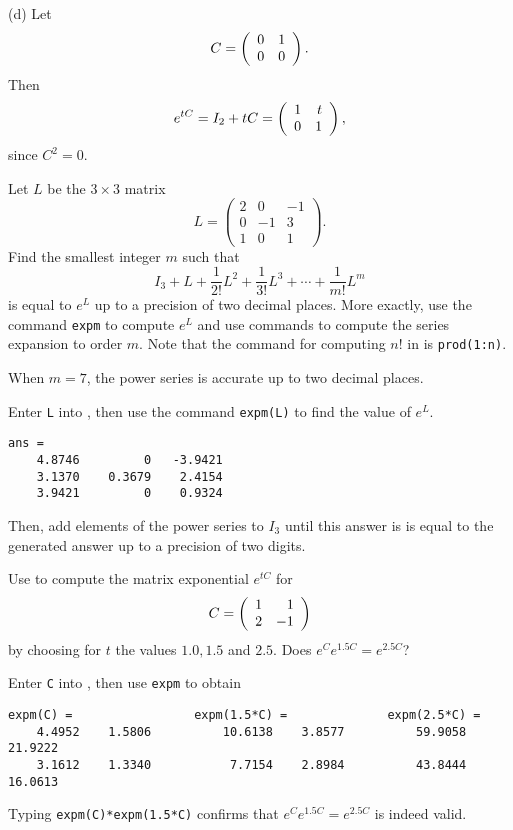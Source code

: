 \documentclass{ximera}
\begin{document}
\noindent (d) \quad Let
\[
C = \left(\begin{array}{rr} 0 & 1\\ 0 &0\end{array}\right).
\]
Then
\begin{equation}  \label{e:nilpotent}
e^{tC} = I_2 + tC = \left(\begin{array}{rr} 1 & t\\ 0 &1\end{array}\right),
\end{equation}
since $C^2=0$.

\EXER

\CEXER

\begin{exercise} \label{c6.2.1}
Let $L$ be the $3\times 3$ matrix
\[
     L = \left(\begin{array}{rrr}
    2 & 0 & -1\\
    0 & -1 & 3\\
    1 & 0 & 1
               \end{array}\right).
\]
Find the smallest integer $m$ such that
\[
  I_3+L+\frac{1}{2!} L^2 + \frac{1}{3!} L^3 + \cdots
  + \frac{1}{m!} L^m
\]
is equal to $e^L$ up to a precision of two decimal places.  More
exactly, use the \Matlab command {\tt expm} to compute $e^L$ and
use \Matlab commands to compute the series expansion to order $m$.  Note
that the command for computing $n!$ in \Matlab is
{\tt prod(1:n)}.

\begin{solution}

\ans When $m = 7$, the power series is accurate up to two decimal places.

\soln Enter {\tt L} into \Matlab, then use the command {\tt expm(L)} to
find the value of $e^L$.
\begin{verbatim}
ans = 
    4.8746         0   -3.9421
    3.1370    0.3679    2.4154
    3.9421         0    0.9324
\end{verbatim}
Then, add elements of the power series to $I_3$ until this answer is
is equal to the \Matlab generated answer up to a precision of two
digits.

\end{solution}
\end{exercise}

\begin{exercise} \label{c6.2.2}
Use \Matlab to compute the matrix exponential $e^{tC}$ for
\[
     C =\left(\begin{array}{rr} 1 & 1\\ 2 &-1\end{array}\right)
\]
by choosing for $t$ the values $1.0,1.5$ and $2.5$.  Does $e^{C}
e^{1.5C}=e^{2.5C}$?

\begin{solution}

Enter {\tt C} into \Matlab, then use {\tt expm} to obtain
\begin{verbatim}
expm(C) =                 expm(1.5*C) =              expm(2.5*C) =
    4.4952    1.5806          10.6138    3.8577          59.9058   21.9222
    3.1612    1.3340           7.7154    2.8984          43.8444   16.0613
\end{verbatim}
Typing {\tt expm(C)*expm(1.5*C)} confirms that $e^Ce^{1.5C} =
e^{2.5C}$ is indeed valid.

\end{solution}
\end{exercise}
\end{document}
